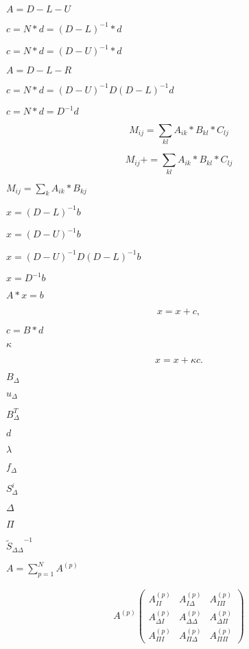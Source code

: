 \documentclass{article}
\begin{document}
$A = D - L - U$
\pagebreak

$ c = N * d = (D-L)^{-1} * d $
\pagebreak

$c = N * d = (D-U)^{-1} * d $
\pagebreak

$A = D - L - R$
\pagebreak

$c = N * d = (D-U)^{-1} D (D-L)^{-1} d $
\pagebreak

$c = N * d = D^{-1} d $
\pagebreak

\[ M_{ij} = \sum_{kl} A_{ik} * B_{kl} * C_{lj} \]
\pagebreak

\[ M_{ij} += \sum_{kl} A_{ik} * B_{kl} * C_{lj} \]
\pagebreak

$ M_{ij} = \sum_k A_{ik} * B_{kj} $
\pagebreak

$x = (D-L)^{-1}b $
\pagebreak

$x = (D-U)^{-1}b $
\pagebreak

$x = (D-U)^{-1} D (D-L)^{-1} b $
\pagebreak

$x = D^{-1} b $
\pagebreak

$ A*x = b $
\pagebreak

\[ x = x + c, \]
\pagebreak

$ c = B*d $
\pagebreak

$ \kappa $
\pagebreak

\[ x = x + \kappa c. \]
\pagebreak

$B_{\Delta}$
\pagebreak

$u_{\Delta}$
\pagebreak

$B_{\Delta}^T$
\pagebreak

$d$
\pagebreak

$\lambda$
\pagebreak

$f_{\Delta}$
\pagebreak

$S_{\Delta}^{i}$
\pagebreak

$ \Delta $
\pagebreak

$ \Pi $
\pagebreak

${\tilde{S}_{\Delta \Delta}}^{-1}$
\pagebreak

$ A = \sum\limits_{p=1}^{N} A^{(p)}$
\pagebreak

\begin{align*} A^{(p)} \begin{pmatrix} A_{II}^{(p)} & A_{I \Delta}^{(p)} & A_{I \Pi}^{(p)} \\ A_{\Delta I}^{(p)} & A_{\Delta \Delta}^{(p)} & A_{\Delta \Pi}^{(p)} \\ A_{\Pi I}^{(p)} & A_{\Pi \Delta}^{(p)} & A_{\Pi \Pi}^{(p)} \end{pmatrix} \end{align*}
\pagebreak
\end{document}
